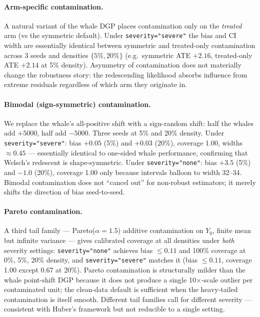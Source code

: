\paragraph{Arm-specific contamination.}
A natural variant of the whale DGP places contamination only on
the \emph{treated} arm (vs the symmetric default). Under
\texttt{severity="severe"} the bias and CI width are essentially
identical between symmetric and treated-only contamination across
3 seeds and densities $\{5\%, 20\%\}$ (e.g.\ symmetric ATE $+2.16$,
treated-only ATE $+2.14$ at 5\% density). Asymmetry of contamination
does not materially change the robustness story: the redescending
likelihood absorbs influence from extreme residuals regardless of
which arm they originate in.

\paragraph{Bimodal (sign-symmetric) contamination.}
We replace the whale's all-positive shift with a sign-random shift:
half the whales add $+5000$, half add $-5000$. Three seeds at 5\%
and 20\% density. Under \texttt{severity="severe"}: bias $+0.05$
(5\%) and $+0.03$ (20\%), coverage 1.00, widths $\approx 0.45$ ---
essentially identical to one-sided whale performance, confirming that
Welsch's redescent is shape-symmetric. Under \texttt{severity="none"}:
bias $+3.5$ (5\%) and $-1.0$ (20\%), coverage 1.00 only because
intervals balloon to width 32--34. Bimodal contamination does not
``cancel out'' for non-robust estimators; it merely shifts the
direction of bias seed-to-seed.

\paragraph{Pareto contamination.}
A third tail family --- Pareto($\alpha = 1.5$) additive
contamination on $Y_0$, finite mean but infinite variance --- gives
calibrated coverage at all densities under \emph{both}
severity settings: \texttt{severity="none"} achieves bias $\le
0.11$ and 100\% coverage at 0\%, 5\%, 20\% density, and
\texttt{severity="severe"} matches it (bias $\le 0.11$, coverage
1.00 except 0.67 at 20\%). Pareto contamination is structurally
milder than the whale point-shift DGP because it does not produce
a single 10$\times$-scale outlier per contaminated unit; the
clean-data default is sufficient when the heavy-tailed contamination
is itself smooth. Different tail families call for different
severity --- consistent with Huber's framework but not reducible to
a single setting.

